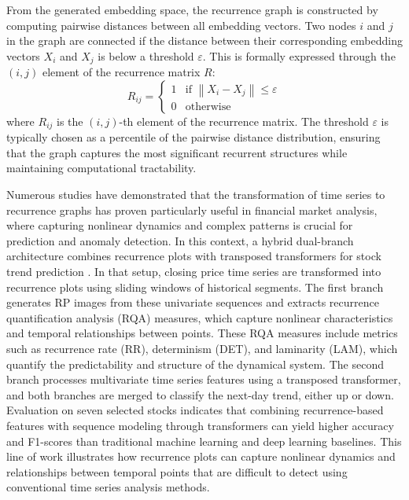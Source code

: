 \documentclass[11pt,a4paper]{article}
\begin{document}
From the generated embedding space, the recurrence graph is constructed by computing pairwise distances between all embedding vectors. Two nodes $i$ and $j$ in the graph are connected if the distance between their corresponding embedding vectors $X_i$ and $X_j$ is below a threshold $\varepsilon$. This is formally expressed through the $(i, j)$ element of the recurrence matrix $R$:
\begin{equation}
R_{ij} = \begin{cases}
1 & \text{if } \left\|X_i - X_j\right\| \le \varepsilon \\
0 & \text{otherwise}
\end{cases}
\end{equation}
where $R_{ij}$ is the $(i, j)$-th element of the recurrence matrix. The threshold $\varepsilon$ is typically chosen as a percentile of the pairwise distance distribution, ensuring that the graph captures the most significant recurrent structures while maintaining computational tractability.

Numerous studies have demonstrated that the transformation of time series to recurrence graphs has proven particularly useful in financial market analysis, where capturing nonlinear dynamics and complex patterns is crucial for prediction and anomaly detection. In this context, a hybrid dual-branch architecture combines recurrence plots with transposed transformers for stock trend prediction \citep{su2025hybrid}. In that setup, closing price time series are transformed into recurrence plots using sliding windows of historical segments. The first branch generates RP images from these univariate sequences and extracts recurrence quantification analysis (RQA) measures, which capture nonlinear characteristics and temporal relationships between points. These RQA measures include metrics such as recurrence rate (RR), determinism (DET), and laminarity (LAM), which quantify the predictability and structure of the dynamical system. The second branch processes multivariate time series features using a transposed transformer, and both branches are merged to classify the next-day trend, either up or down. Evaluation on seven selected stocks indicates that combining recurrence-based features with sequence modeling through transformers can yield higher accuracy and F1-scores than traditional machine learning and deep learning baselines. This line of work illustrates how recurrence plots can capture nonlinear dynamics and relationships between temporal points that are difficult to detect using conventional time series analysis methods.
\end{document}
